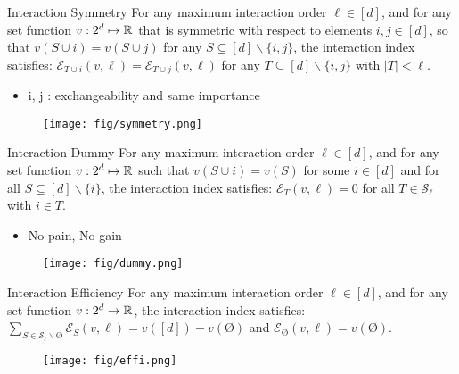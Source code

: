 \documentclass[10pt]{beamer}
\newcommand{\f}{v}
\newcommand{\ex}{\Expl}
\def\Expl{\mathcal{E}}
\begin{document}
\begin{frame}
    \begin{myaxiombox}{Interaction Symmetry}
        For any maximum interaction order $\ell \in [d]$, and for any set function $\f:2^d \mapsto \R$ that is symmetric with respect to elements $i, j \in [d]$, so that
$\f(S \! \cup  i) = \f(S \! \cup  j) \!$ for any $S \subseteq [d] \backslash \{i,j\}$, the interaction index satisfies: $\ex_{T \cup i}(\f,\ell) = \ex_{ T \cup j}(\f,\ell)$ for any $T \subseteq [d] \backslash \{i,j\}$ with $|T| < \ell$.
    \end{myaxiombox}
    \begin{itemize}[label=\scalebox{0.5}{$\blacksquare$}]
        \item i, j : exchangeability and same importance
    \end{itemize}
\end{frame}
\begin{frame}
    \begin{figure}[h]
    \centering
    \texttt{[image: fig/symmetry.png]}
    \end{figure}
\end{frame}

\begin{frame}
    \begin{myaxiombox}{Interaction Dummy}
        For any maximum interaction order $\ell \in [d]$, and for any set function $\f:2^d \mapsto \R$ such that $\f(S \cup i) = \f(S)$ for some $i \in [d]$ and for all $ S \subseteq [d] \backslash \{i\}$, the interaction index satisfies:  $\ex_{T}(\f, \ell) = 0$ for all $T \in \mathcal{S}_\ell$ with $i \in T$.
    \end{myaxiombox}
    \begin{itemize}[label=\scalebox{0.5}{$\blacksquare$}]
        \item No pain, No gain
    \end{itemize}
\end{frame}
\begin{frame}
    \begin{figure}[h]
    \centering
    \texttt{[image: fig/dummy.png]}
    \end{figure}
\end{frame}

\begin{frame}
    \begin{myaxiombox}{Interaction Efficiency}
        For any maximum interaction order $\ell \in [d]$, and for any set function $\f:2^d \rightarrow \R$, the interaction index satisfies: $\sum_{S \in \mathcal{S}_\ell\backslash\text{\O}} \ex_S(\f,\ell) = \f([d]) - \f(\text{\O})$ and $\ex_{\text{\O}}(\f,\ell) = \f(\text{\O})$.
    \end{myaxiombox}
\end{frame}
\begin{frame}
    \begin{figure}[h]
    \centering
    \texttt{[image: fig/effi.png]}
    \end{figure}
\end{frame}
\end{document}
